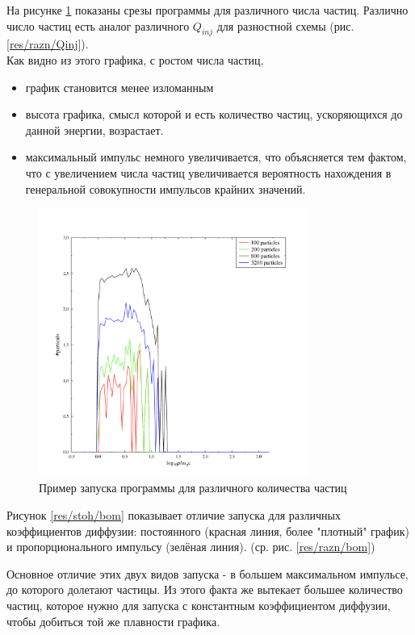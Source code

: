\documentclass[a4paper,14pt]{extarticle} %
\begin{document}
На рисунке \ref{res/stoh/particles} показаны срезы программы для различного числа частиц. Различно число частиц есть аналог различного $Q_{inj}$ для разностной схемы (рис. \ref{res/razn/Qinj}).\\
 Как видно из этого графика, с ростом числа частиц,
\begin{itemize}
\item график становится менее изломанным
\item высота графика, смысл которой и есть количество частиц, ускоряющихся до данной энергии, возрастает.
\item максимальный импульс немного увеличивается, что объясняется тем фактом, что с увеличением числа частиц увеличивается вероятность нахождения в генеральной совокупности импульсов крайних значений.
\end{itemize}
\begin{figure}[H]
\centering
\includegraphics[width=250pt]{stoh_particles}
\caption{Пример запуска программы для различного количества частиц}
\label{res/stoh/particles}
\end{figure}
Рисунок \ref{res/stoh/bom} показывает отличие запуска для различных коэффициентов диффузии: постоянного (красная линия, более "плотный" график) и пропорционального импульсу (зелёная линия). (ср. рис. \ref{res/razn/bom})

Основное отличие этих двух видов запуска - в большем максимальном импульсе, до которого долетают частицы. Из этого факта же вытекает большее количество частиц, которое нужно для запуска с константным коэффициентом диффузии, чтобы добиться той же плавности графика.
\end{document}
